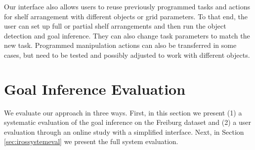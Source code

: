 

Our interface also allows users to reuse previously programmed tasks and actions for shelf arrangement with different objects or grid parameters.
To that end, the user can set up full or partial shelf arrangements and then run the object detection and goal inference.
They can also change task parameters to match the new task.
Programmed manipulation actions can also be transferred in some cases, but need to be tested and possibly adjusted to work with different objects.



\section{Goal Inference Evaluation}\label{sec:irosinfeval}
We evaluate our approach in three ways.
First, in this section we present (1) a systematic evaluation of the goal inference on the Freiburg dataset and (2) a user evaluation through an online study with a simplified interface. Next, in Section \ref{sec:irossystemeval} we present the full system evaluation.

